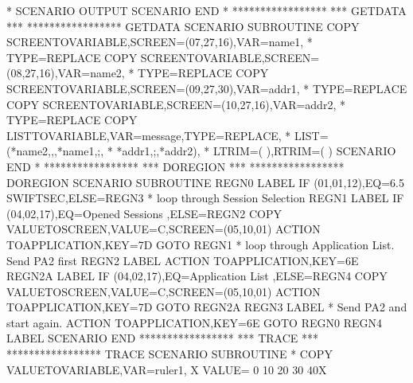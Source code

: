 \documentclass[letterpaper,10pt,english]{sphinxmanual}
\begin{document}
\begin{sphinxVerbatim}[commandchars=\\\{\}]
*
         SCENARIO OUTPUT
         SCENARIO END
*
*****************
*** GETDATA   ***
*****************
GETDATA  SCENARIO SUBROUTINE
         COPY\PYGZdl{} SCREEN\PYGZhy{}TO\PYGZhy{}VARIABLE,SCREEN=(07,27,16),VAR=name1,         *
               TYPE=REPLACE
         COPY\PYGZdl{} SCREEN\PYGZhy{}TO\PYGZhy{}VARIABLE,SCREEN=(08,27,16),VAR=name2,         *
               TYPE=REPLACE
         COPY\PYGZdl{} SCREEN\PYGZhy{}TO\PYGZhy{}VARIABLE,SCREEN=(09,27,30),VAR=addr1,         *
               TYPE=REPLACE
         COPY\PYGZdl{} SCREEN\PYGZhy{}TO\PYGZhy{}VARIABLE,SCREEN=(10,27,16),VAR=addr2,         *
               TYPE=REPLACE
         COPY\PYGZdl{} LIST\PYGZhy{}TO\PYGZhy{}VARIABLE,VAR=\PYGZsq{}message\PYGZsq{},TYPE=REPLACE,            *
               LIST=(\PYGZsq{}*name2\PYGZsq{},\PYGZsq{},\PYGZsq{},\PYGZsq{}*name1\PYGZsq{},\PYGZsq{};\PYGZsq{},                        *
               \PYGZsq{}*addr1\PYGZsq{},\PYGZsq{};\PYGZsq{},\PYGZsq{}*addr2\PYGZsq{}),                                 *
               LTRIM=(\PYGZsq{} \PYGZsq{}),RTRIM=(\PYGZsq{} \PYGZsq{})
         SCENARIO END
*
*****************
*** DOREGION  ***
*****************
DOREGION SCENARIO SUBROUTINE
REGN0    LABEL\PYGZdl{}
         IF\PYGZdl{}   (01,01,12),EQ=\PYGZdq{}6.5 SWIFTSEC\PYGZdq{},ELSE=REGN3
*    loop through Session Selection
REGN1    LABEL\PYGZdl{}
         IF\PYGZdl{}   (04,02,17),EQ=\PYGZsq{}Opened Sessions \PYGZsq{},ELSE=REGN2
         COPY\PYGZdl{} VALUE\PYGZhy{}TO\PYGZhy{}SCREEN,VALUE=\PYGZsq{}C\PYGZsq{},SCREEN=(05,10,01)
         ACTION\PYGZdl{}  TO\PYGZhy{}APPLICATION,KEY=7D
         GOTO\PYGZdl{} REGN1
*    loop through Application List. Send PA2 first
REGN2    LABEL\PYGZdl{}
         ACTION\PYGZdl{}  TO\PYGZhy{}APPLICATION,KEY=6E
REGN2A   LABEL\PYGZdl{}
         IF\PYGZdl{}   (04,02,17),EQ=\PYGZsq{}Application List \PYGZsq{},ELSE=REGN4
         COPY\PYGZdl{} VALUE\PYGZhy{}TO\PYGZhy{}SCREEN,VALUE=\PYGZsq{}C\PYGZsq{},SCREEN=(05,10,01)
         ACTION\PYGZdl{}  TO\PYGZhy{}APPLICATION,KEY=7D
         GOTO\PYGZdl{} REGN2A
REGN3    LABEL\PYGZdl{}
* Send PA2 and start again.
         ACTION\PYGZdl{}  TO\PYGZhy{}APPLICATION,KEY=6E
         GOTO\PYGZdl{} REGN0
REGN4    LABEL\PYGZdl{}
         SCENARIO END
*****************
***  TRACE    ***
*****************
TRACE    SCENARIO SUBROUTINE
*
         COPY\PYGZdl{} VALUE\PYGZhy{}TO\PYGZhy{}VARIABLE,VAR=\PYGZsq{}ruler1\PYGZsq{},                         X
               VALUE=\PYGZsq{}\PYGZhy{}\PYGZhy{}\PYGZhy{}  0\PYGZhy{}\PYGZhy{}\PYGZhy{}\textbar{}\PYGZhy{}\PYGZhy{}\PYGZhy{} 10\PYGZhy{}\PYGZhy{}\PYGZhy{}\textbar{}\PYGZhy{}\PYGZhy{}\PYGZhy{} 20\PYGZhy{}\PYGZhy{}\PYGZhy{}\textbar{}\PYGZhy{}\PYGZhy{}\PYGZhy{} 30\PYGZhy{}\PYGZhy{}\PYGZhy{}\textbar{}\PYGZhy{}\PYGZhy{}\PYGZhy{} 40\PYGZhy{}\PYGZhy{}\PYGZhy{}X

\end{sphinxVerbatim}
\end{document}

